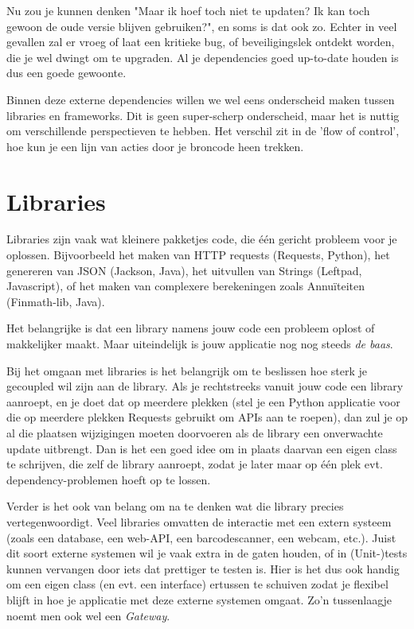 Nu zou je kunnen denken "Maar ik hoef toch niet te updaten? Ik kan toch gewoon de oude versie blijven gebruiken?",
en soms is dat ook zo. Echter in veel gevallen zal er vroeg of laat een kritieke bug, of beveiligingslek ontdekt 
worden, die je wel dwingt om te upgraden. Al je dependencies goed up-to-date houden is dus een goede gewoonte.

Binnen deze externe dependencies willen we wel eens onderscheid maken tussen libraries en frameworks. 
Dit is geen super-scherp onderscheid, maar het is nuttig om verschillende perspectieven te hebben. 
Het verschil zit in de 'flow of control', hoe kun je een lijn van acties door je broncode heen trekken. 

\section{Libraries}

Libraries zijn vaak wat kleinere pakketjes code, die één gericht probleem voor je oplossen. Bijvoorbeeld het 
maken van HTTP requests (Requests, Python), het genereren van JSON (Jackson, Java), het uitvullen van Strings (Leftpad, Javascript),
of het maken van complexere berekeningen zoals Annuïteiten (Finmath-lib, Java).

Het belangrijke is dat een library namens jouw code een probleem oplost of makkelijker maakt. Maar uiteindelijk is jouw applicatie nog
nog steeds \emph{de baas}.

Bij het omgaan met libraries is het belangrijk om te beslissen hoe sterk je gecoupled wil zijn aan de library.
Als je rechtstreeks vanuit jouw code een library aanroept, en je doet dat op meerdere plekken 
(stel je een Python applicatie voor die op meerdere plekken Requests gebruikt om APIs aan te roepen), dan zul je 
op al die plaatsen wijzigingen moeten doorvoeren als de library een onverwachte update uitbrengt. Dan is het een
goed idee om in plaats daarvan een eigen class te schrijven, die zelf de library aanroept, zodat je later maar
op één plek evt. dependency-problemen hoeft op te lossen.

Verder is het ook van belang om na te denken wat die library precies vertegenwoordigt. Veel libraries omvatten
de interactie met een extern systeem (zoals een database, een web-API, een barcodescanner, een webcam, etc.). Juist 
dit soort externe systemen wil je vaak extra in de gaten houden, of in (Unit-)tests kunnen vervangen door iets 
dat prettiger te testen is. Hier is het dus ook handig om een eigen class (en evt. een interface) ertussen te schuiven
zodat je flexibel blijft in hoe je applicatie met deze externe systemen omgaat. Zo'n tussenlaagje noemt men ook wel
een \emph{Gateway}.

